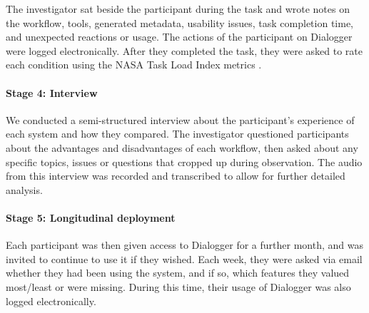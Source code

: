     The investigator sat beside the participant during the task and wrote notes on the workflow, tools, generated
    metadata, usability issues, task completion time, and unexpected reactions or usage.
    The actions of the participant on Dialogger were logged electronically. After they completed the task, they were
    asked to rate each condition using the NASA Task Load Index metrics \citep{Hart1988}.


\paragraph{Stage 4: Interview}
    We conducted a semi-structured interview about the participant's experience of each system and how they compared.
    The investigator questioned participants about the advantages and disadvantages of each workflow, then asked about
    any specific topics, issues or questions that cropped up during observation. The audio from this interview was
    recorded and transcribed to allow for further detailed analysis.


\paragraph{Stage 5: Longitudinal deployment}
    Each participant was then given access to Dialogger for a further month, and was invited to continue to use it if
    they wished. Each week, they were asked via email whether they had been using the system, and if so, which features
    they valued most/least or were missing.  During this time, their usage of Dialogger was also logged electronically.

